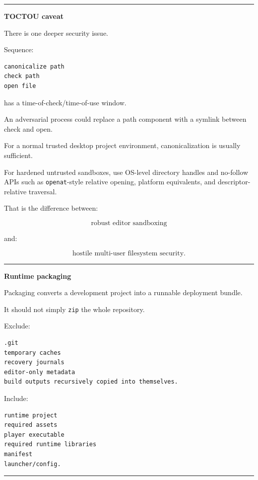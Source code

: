 \begin{center}\rule{0.5\linewidth}{0.5pt}\end{center}

\textbf{TOCTOU caveat}

There is one deeper security issue.

Sequence:

\begin{verbatim}
canonicalize path
check path
open file
\end{verbatim}

has a time-of-check/time-of-use window.

An adversarial process could replace a path component with a symlink between check and open.

For a normal trusted desktop project environment, canonicalization is usually sufficient.

For hardened untrusted sandboxes, use OS-level directory handles and no-follow APIs such as \texttt{openat}-style relative opening, platform equivalents, and descriptor-relative traversal.

That is the difference between:

\[
\text{robust editor sandboxing}
\]

and:

\[
\text{hostile multi-user filesystem security}.
\]

\begin{center}\rule{0.5\linewidth}{0.5pt}\end{center}

\textbf{Runtime packaging}

Packaging converts a development project into a runnable deployment bundle.

It should not simply \texttt{zip} the whole repository.

Exclude:

\begin{verbatim}
.git
temporary caches
recovery journals
editor-only metadata
build outputs recursively copied into themselves.
\end{verbatim}

Include:

\begin{verbatim}
runtime project
required assets
player executable
required runtime libraries
manifest
launcher/config.
\end{verbatim}

\begin{center}\rule{0.5\linewidth}{0.5pt}\end{center}

